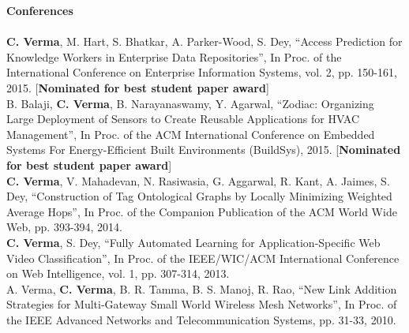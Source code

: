 \documentclass[12pt]{ucsddissertation}
\newcommand{\comment}[1]{}
\begin{document}
\begin{vita}
{\noindent\textbf{Conferences} \\ \\
\noindent \textbf{C. Verma}, M. Hart, S. Bhatkar, A. Parker-Wood, S. Dey, ``Access Prediction for Knowledge Workers in Enterprise Data Repositories'', In Proc. of the International Conference on Enterprise Information Systems, vol. 2, pp. 150-161, 2015. [\textbf{Nominated for best student paper award}] \\

\noindent B. Balaji, \textbf{C. Verma}, B. Narayanaswamy, Y. Agarwal, ``Zodiac: Organizing Large Deployment of Sensors to Create Reusable Applications for HVAC Management'', In Proc. of the ACM International Conference on Embedded Systems For Energy-Efficient Built Environments (BuildSys), 2015.  [\textbf{Nominated for best student paper award}]\\

\noindent \textbf{C. Verma}, V. Mahadevan, N. Rasiwasia, G. Aggarwal, R. Kant, A. Jaimes, S. Dey, ``Construction of Tag Ontological Graphs by Locally Minimizing Weighted Average Hops'', In Proc. of the Companion Publication of the ACM World Wide Web, pp. 393-394, 2014. \\ 


\noindent \textbf{C. Verma}, S. Dey, ``Fully Automated Learning for Application-Specific Web Video Classification'', In Proc. of the IEEE/WIC/ACM International Conference on Web Intelligence, vol. 1, pp. 307-314, 2013. \\ 

\noindent A. Verma, \textbf{C. Verma}, B. R. Tamma, B. S. Manoj, R. Rao, ``New Link Addition Strategies for Multi-Gateway Small World Wireless Mesh Networks'', In Proc. of the IEEE Advanced Networks and  Telecommunication Systems, pp. 31-33, 2010. 

}

\comment{

\fieldsofstudy
\noindent Major Field: Engineering (Specialization or Focused Studies)
\vskip\baselineskip
Studies in Applied Mathematics\par
Professors Alpha Beta and Gamma Delta
\vskip\baselineskip
Studies in Mechanices\par
Professors Epsilon Zeta and Eta Theta
\vskip\baselineskip
Studies in Electromagnetism\par
Professors Iota Kappa and Lambda Mu

}
\end{vita}
\end{document}
